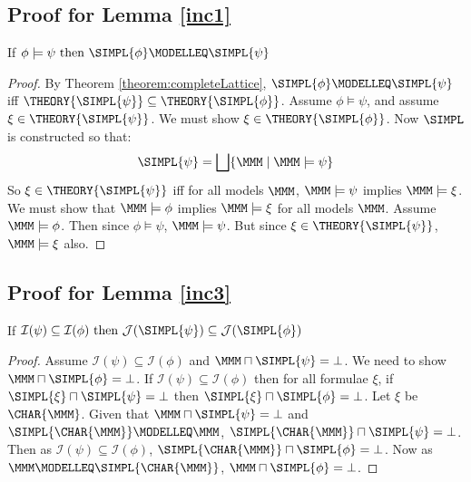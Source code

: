 \subsection{Proof for Lemma \ref{inc1}}
If $\phi \models \psi \mbox{ then } \SIMPL{\phi} \MODELLEQ \SIMPL{\psi}$

\begin{proof}
By Theorem \ref{theorem:completeLattice}, $ \SIMPL{\phi} \MODELLEQ \SIMPL{\psi}$ iff $\THEORY{\SIMPL{\psi}} \subseteq  \THEORY{\SIMPL{\phi}}$.
Assume $\phi \models \psi$, and assume $\xi \in \THEORY{\SIMPL{\psi}} $. We must show $\xi \in \THEORY{\SIMPL{\phi}} $.
Now $\SIMPL$ is constructed so that:
\[
\SIMPL{\psi} = \bigsqcup \{ \MMM \; | \; \MMM \models \psi \}
\]
So  $\xi \in \THEORY{\SIMPL{\psi}} $ iff for all models $\MMM$, $\MMM \models \psi$ implies $\MMM \models \xi$.
We must show that $\MMM \models \phi$ implies $\MMM \models \xi$ for all models $\MMM$.
Assume $\MMM \models \phi$. Then since $\phi \models \psi$,  $\MMM \models \psi$. 
But since $\xi \in \THEORY{\SIMPL{\psi}} $, $\MMM \models \xi$ also.

\end{proof}

\subsection{Proof for Lemma \ref{inc3}}
If $\mathcal{I}(\psi) \subseteq \mathcal{I}(\phi) \mbox{ then } \mathcal{J}(\SIMPL{\psi}) \subseteq \mathcal{J}(\SIMPL{\phi})$
\begin{proof}
Assume $\mathcal{I}(\psi) \subseteq \mathcal{I}(\phi)$ and $\MMM \sqcap \SIMPL{\psi} = \bot$.
We need to show $\MMM \sqcap \SIMPL{\phi} = \bot$.
If $\mathcal{I}(\psi) \subseteq \mathcal{I}(\phi)$ then for all formulae $\xi$, if $\SIMPL{\xi} \sqcap \SIMPL{\psi} = \bot$ then $\SIMPL{\xi} \sqcap \SIMPL{\phi} = \bot$.
Let $\xi$ be $\CHAR{\MMM}$.
Given that $\MMM \sqcap \SIMPL{\psi} = \bot$ and $\SIMPL{\CHAR{\MMM}} \MODELLEQ \MMM$, $\SIMPL{\CHAR{\MMM}} \sqcap \SIMPL{\psi} = \bot$.
Then as $\mathcal{I}(\psi) \subseteq \mathcal{I}(\phi)$, $\SIMPL{\CHAR{\MMM}} \sqcap \SIMPL{\phi} = \bot$.
Now as $\MMM  \MODELLEQ \SIMPL{\CHAR{\MMM}}$, $\MMM \sqcap \SIMPL{\phi} = \bot$.

\end{proof}
